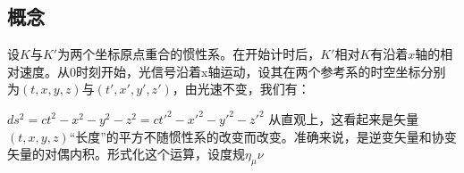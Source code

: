 \subsection{概念}
设$K$与$K'$为两个坐标原点重合的惯性系。在开始计时后，$K'$相对$K$有沿着$x$轴的相对速度。从$0$时刻开始，光信号沿着x轴运动，设其在两个参考系的时空坐标分别为$(t,x,y,z)$与$(t',x',y',z')$，由光速不变，我们有：

$ds^2=ct^2-x^2-y^2-z^2=ct'^2-x'^2-y'^2-z'^2$
从直观上，这看起来是矢量$(t,x,y,z)$“长度”的平方不随惯性系的改变而改变。准确来说，是逆变矢量和协变矢量的对偶内积。形式化这个运算，设度规$\eta_\mu\nu $ 
